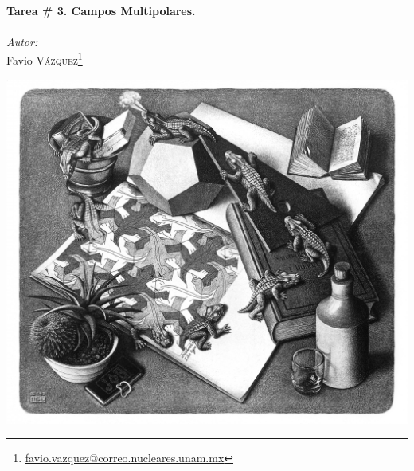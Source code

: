 \documentclass[a4paper,11pt]{article}
\numberwithin{equation}{section}
\begin{document}
\begin{titlepage}

\HRule \\[0.4cm]
{ \huge \bfseries Tarea \# 3. Campos Multipolares.}\\[0.2cm] %
\HRule \\[1cm]
 
\setcounter{footnote}{0}
\center
\large
\emph{Autor:} \\ %
\Large Favio \textsc{Vázquez}\footnote[1]{\href{mailto:favio.vazquez@correo.nucleares.unam.mx}{favio.vazquez@correo.nucleares.unam.mx}}


\includegraphics[scale=0.135]{reptilesEscher}


\vfill %

\end{titlepage}
\end{document}
